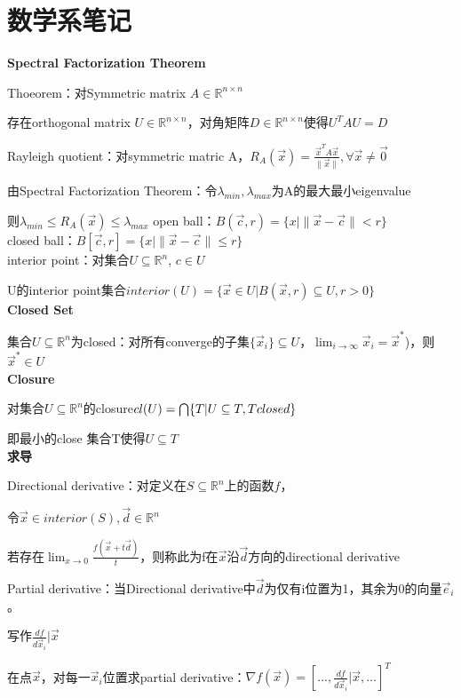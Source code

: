\documentclass[UTF8]{ctexart}
\begin{document}
\section{数学系笔记}
\noindent \textbf{Spectral Factorization Theorem}

  Thoeorem：对Symmetric matrix $A \in \mathbb{R}^{n \times n}$
  
  \quad 存在orthogonal matrix $U \in \mathbb{R}^{n \times n}$，对角矩阵$D \in \mathbb{R}^{n \times n}$使得$U^TAU = D$

  Rayleigh quotient：对symmetric matric A，$R_A(\vec{x}) = \frac{\vec{x}^TA\vec{x}}{\|\vec{x}\|}, \forall \vec{x} \neq \vec{0}$

  由Spectral Factorization Theorem：令$\lambda_{min}, \lambda_{max}$为A的最大最小eigenvalue

  \quad 则$\lambda_{min} \leq R_A(\vec{x}) \leq \lambda_{max}$
open ball：$B(\vec{c}, r) = \{x | \|\vec{x} - \vec{c}\| < r\}$\\
closed ball：$B[\vec{c}, r] = \{x | \|\vec{x} - \vec{c}\| \leq r\}$\\
interior point：对集合$U \subseteq \mathbb{R}^n$, $c \in U$

  U的interior point集合$interior(U) = \{\vec{x} \in U | B(\vec{x}, r) \subseteq U, r > 0\}$\\
\textbf{Closed Set}

  集合$U \subseteq \mathbb{R}^n $为closed：对所有converge的子集$\{\vec{x}_i\} \subseteq U$，$\lim_{i \to \infty} \vec{x}_i = \vec{x}^*$)，则$\vec{x}^* \in U$\\
\textbf{Closure}

  对集合$U \subseteq \mathbb{R}^n $的closure$cl(U) = \bigcap\{T | U \subseteq T, T \space closed\}$

  \quad 即最小的close 集合T使得$U \subseteq T$\\
\textbf{求导}

  Directional derivative：对定义在$S \subseteq \mathbb{R}^n$上的函数$f$，
  
  \quad 令$\vec{x} \in interior(S), \vec{d} \in \mathbb{R}^n$

  \quad 若存在$\lim_{x \to 0} \frac{f(\vec{x} + t\vec{d})}{t} $，则称此为f在$\vec{x}$沿$\vec{d}$方向的directional derivative
  
  Partial derivative：当Directional derivative中$\vec{d}$为仅有i位置为1，其余为0的向量$\vec{e}_i$。
  
  \quad 写作$\frac{df}{d\vec{x}_i}|\vec{x}$

  \quad 在点$\vec{x}$，对每一$\vec{x}_i$位置求partial derivative：$\nabla f(\vec{x}) = [..., \frac{df}{d\vec{x}_i}|\vec{x}, ...]^T$
  
\end{document}
